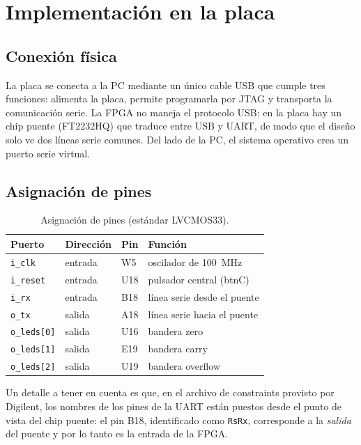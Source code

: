 \documentclass[12pt,a4paper]{article}
\begin{document}
\section{Implementación en la placa}

\subsection{Conexión física}

La placa se conecta a la PC mediante un único cable USB que cumple tres
funciones: alimenta la placa, permite programarla por JTAG y transporta la
comunicación serie. La FPGA no maneja el protocolo USB: en la placa hay un chip
puente (FT2232HQ) que traduce entre USB y UART, de modo que el diseño solo ve
dos líneas serie comunes. Del lado de la PC, el sistema operativo crea un puerto
serie virtual.

\subsection{Asignación de pines}

\begin{table}[H]
  \centering
  \small
  \begin{tabular}{@{}llll@{}}
    \toprule
    \textbf{Puerto} & \textbf{Dirección} & \textbf{Pin} & \textbf{Función} \\
    \midrule
    \texttt{i\_clk}      & entrada & W5  & oscilador de 100~MHz \\
    \texttt{i\_reset}    & entrada & U18 & pulsador central (btnC) \\
    \texttt{i\_rx}       & entrada & B18 & línea serie desde el puente \\
    \texttt{o\_tx}       & salida  & A18 & línea serie hacia el puente \\
    \texttt{o\_leds[0]}  & salida  & U16 & bandera zero \\
    \texttt{o\_leds[1]}  & salida  & E19 & bandera carry \\
    \texttt{o\_leds[2]}  & salida  & U19 & bandera overflow \\
    \bottomrule
  \end{tabular}
  \caption{Asignación de pines (estándar LVCMOS33).}
\end{table}

Un detalle a tener en cuenta es que, en el archivo de constraints provisto por
Digilent, los nombres de los pines de la UART están puestos desde el punto de
vista del chip puente: el pin B18, identificado como \texttt{RsRx}, corresponde
a la \emph{salida} del puente y por lo tanto es la entrada de la FPGA.
\end{document}
